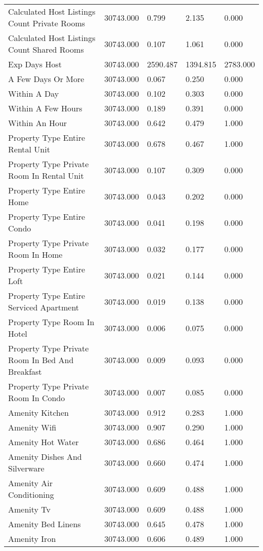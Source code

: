 \begin{tabular}{lllll}
Calculated Host Listings Count Private Rooms & 30743.000 & 0.799 & 2.135 & 0.000 \\
Calculated Host Listings Count Shared Rooms & 30743.000 & 0.107 & 1.061 & 0.000 \\
Exp Days Host & 30743.000 & 2590.487 & 1394.815 & 2783.000 \\
A Few Days Or More & 30743.000 & 0.067 & 0.250 & 0.000 \\
Within A Day & 30743.000 & 0.102 & 0.303 & 0.000 \\
Within A Few Hours & 30743.000 & 0.189 & 0.391 & 0.000 \\
Within An Hour & 30743.000 & 0.642 & 0.479 & 1.000 \\
Property Type Entire Rental Unit & 30743.000 & 0.678 & 0.467 & 1.000 \\
Property Type Private Room In Rental Unit & 30743.000 & 0.107 & 0.309 & 0.000 \\
Property Type Entire Home & 30743.000 & 0.043 & 0.202 & 0.000 \\
Property Type Entire Condo & 30743.000 & 0.041 & 0.198 & 0.000 \\
Property Type Private Room In Home & 30743.000 & 0.032 & 0.177 & 0.000 \\
Property Type Entire Loft & 30743.000 & 0.021 & 0.144 & 0.000 \\
Property Type Entire Serviced Apartment & 30743.000 & 0.019 & 0.138 & 0.000 \\
Property Type Room In Hotel & 30743.000 & 0.006 & 0.075 & 0.000 \\
Property Type Private Room In Bed And Breakfast & 30743.000 & 0.009 & 0.093 & 0.000 \\
Property Type Private Room In Condo & 30743.000 & 0.007 & 0.085 & 0.000 \\
Amenity Kitchen & 30743.000 & 0.912 & 0.283 & 1.000 \\
Amenity Wifi & 30743.000 & 0.907 & 0.290 & 1.000 \\
Amenity Hot Water & 30743.000 & 0.686 & 0.464 & 1.000 \\
Amenity Dishes And Silverware & 30743.000 & 0.660 & 0.474 & 1.000 \\
Amenity Air Conditioning & 30743.000 & 0.609 & 0.488 & 1.000 \\
Amenity Tv & 30743.000 & 0.609 & 0.488 & 1.000 \\
Amenity Bed Linens & 30743.000 & 0.645 & 0.478 & 1.000 \\
Amenity Iron & 30743.000 & 0.606 & 0.489 & 1.000 \\

\end{tabular}
